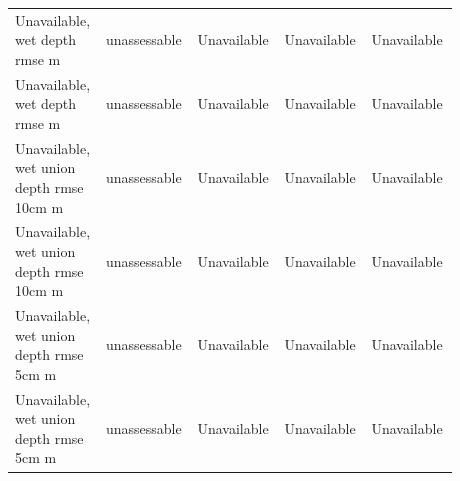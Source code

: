 \begin{longtable}{p{0.1760\linewidth}p{0.1760\linewidth}p{0.1760\linewidth}p{0.1760\linewidth}p{0.1760\linewidth}}
Unavailable, wet depth rmse m & unassessable & Unavailable & Unavailable & Unavailable \\
Unavailable, wet depth rmse m & unassessable & Unavailable & Unavailable & Unavailable \\
Unavailable, wet union depth rmse 10cm m & unassessable & Unavailable & Unavailable & Unavailable \\
Unavailable, wet union depth rmse 10cm m & unassessable & Unavailable & Unavailable & Unavailable \\
Unavailable, wet union depth rmse 5cm m & unassessable & Unavailable & Unavailable & Unavailable \\
Unavailable, wet union depth rmse 5cm m & unassessable & Unavailable & Unavailable & Unavailable \\
\end{longtable}

